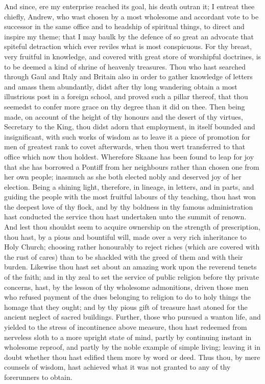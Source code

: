 \documentclass[10pt,a4paper]{report}
\begin{document}
And since, ere my enterprise reached its goal, his death outran it; I entreat thee chiefly, Andrew, who wast chosen by a most wholesome and accordant vote to be successor in the same office and to headship of spiritual things, to direct and inspire my theme; that I may baulk by the defence of so great an advocate that spiteful detraction which ever reviles what is most conspicuous. For thy breast, very fruitful in knowledge, and covered with great store of worshipful doctrines, is to be deemed a kind of shrine of heavenly treasures. Thou who hast searched through Gaul and Italy and Britain also in order to gather knowledge of letters and amass them abundantly, didst after thy long wandering obtain a most illustrious post in a foreign school, and proved such a pillar thereof, that thou seemedst to confer more grace on thy degree than it did on thee. Then being made, on account of the height of thy honours and the desert of thy virtues, Secretary to the King, thou didst adorn that employment, in itself bounded and insignificant, with such works of wisdom as to leave it a piece of promotion for men of greatest rank to covet afterwards, when thou wert transferred to that office which now thou holdest. Wherefore Skaane has been found to leap for joy that she has borrowed a Pontiff from her neighbours rather than chosen one from her own people; inasmuch as she both elected nobly and deserved joy of her election. Being a shining light, therefore, in lineage, in letters, and in parts, and guiding the people with the most fruitful labours of thy teaching, thou hast won the deepest love of thy flock, and by thy boldness in thy famous administration hast conducted the service thou hast undertaken unto the summit of renown. And lest thou shouldst seem to acquire ownership on the strength of prescription, thou hast, by a pious and bountiful will, made over a very rich inheritance to Holy Church; choosing rather honourably to reject riches (which are covered with the rust of cares) than to be shackled with the greed of them and with their burden. Likewise thou hast set about an amazing work upon the reverend tenets of the faith; and in thy zeal to set the service of public religion before thy private concerns, hast, by the lesson of thy wholesome admonitions, driven those men who refused payment of the dues belonging to religion to do to holy things the homage that they ought; and by thy pious gift of treasure hast atoned for the ancient neglect of sacred buildings. Further, those who pursued a wanton life, and yielded to the stress of incontinence above measure, thou hast redeemed from nerveless sloth to a more upright state of mind, partly by continuing instant in wholesome reproof, and partly by the noble example of simple living; leaving it in doubt whether thou hast edified them more by word or deed. Thus thou, by mere counsels of wisdom, hast achieved what it was not granted to any of thy forerunners to obtain.\\
\end{document}
